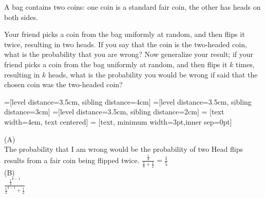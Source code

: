 \documentclass[solution,letterpaper]{cs20}
\begin{document}
    \begin{problem}
        A bag contains two coins: one coin is a standard fair coin, the other
        has heads on both sides.

        \subproblem Your friend picks a coin from the bag
        uniformly at random, and then flips it twice, resulting in two heads.
        If you say that the coin is the two-headed coin, what is
        the probability that you are wrong?
        \subproblem Now generalize your result;  if your friend picks a coin from the bag
        uniformly at random, and then flips it $k$ times, resulting in $k$ heads,
        what is the probability you would be wrong if said that the chosen coin was
        the two-headed coin?

        \begin{solution}

            =[level distance=3.5cm, sibling distance=4cm]
            =[level distance=3.5cm, sibling distance=3cm]
            =[level distance=3.5cm, sibling distance=2cm]
             = [text width=4em, text centered]
             = [text, minimum width=3pt,inner sep=0pt]


            (A) \\
            The probability that I am wrong would be the probability of two Head flips results from a fair coin being flipped twice. $\frac{\frac{1}{8}}{\frac{1}{8} + \frac{1}{2}} = \frac{1}{5}$ \\
            (B) \\
            $\frac{\frac{1}{2}^{k-1}}{\frac{1}{2}^{k-1} + \frac{1}{2}}$ \\
        \end{solution}
    \end{problem}
    \newpage
\end{document}
